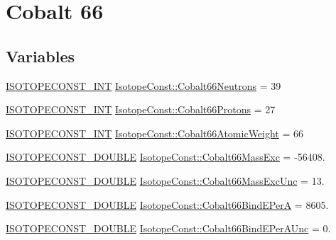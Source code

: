 \hypertarget{group___isotope_const-_cobalt-_co66}{}\section{Cobalt 66}
\label{group___isotope_const-_cobalt-_co66}
\subsection*{Variables}
\begin{DoxyCompactItemize}
\item 
\mbox{\hyperlink{group___isotope_const-_macros_ga5f18360b3e99483a35c32d789e62621c}{I\+S\+O\+T\+O\+P\+E\+C\+O\+N\+S\+T\+\_\+\+I\+NT}} \mbox{\hyperlink{group___isotope_const-_cobalt-_co66_ga19dc6760cf5fea107b61b0d1f699dc3a}{Isotope\+Const\+::\+Cobalt66\+Neutrons}} = 39
\item 
\mbox{\hyperlink{group___isotope_const-_macros_ga5f18360b3e99483a35c32d789e62621c}{I\+S\+O\+T\+O\+P\+E\+C\+O\+N\+S\+T\+\_\+\+I\+NT}} \mbox{\hyperlink{group___isotope_const-_cobalt-_co66_ga4cee81ba35179fd734057518c8e28585}{Isotope\+Const\+::\+Cobalt66\+Protons}} = 27
\item 
\mbox{\hyperlink{group___isotope_const-_macros_ga5f18360b3e99483a35c32d789e62621c}{I\+S\+O\+T\+O\+P\+E\+C\+O\+N\+S\+T\+\_\+\+I\+NT}} \mbox{\hyperlink{group___isotope_const-_cobalt-_co66_ga8c07a41896d436ac348195516a393fbb}{Isotope\+Const\+::\+Cobalt66\+Atomic\+Weight}} = 66
\item 
\mbox{\hyperlink{group___isotope_const-_macros_ga8f45a7272ce02c0b4c65c44636ed719a}{I\+S\+O\+T\+O\+P\+E\+C\+O\+N\+S\+T\+\_\+\+D\+O\+U\+B\+LE}} \mbox{\hyperlink{group___isotope_const-_cobalt-_co66_ga946fee28f61429e761521b1a4e7169a6}{Isotope\+Const\+::\+Cobalt66\+Mass\+Exc}} = -\/56408.
\item 
\mbox{\hyperlink{group___isotope_const-_macros_ga8f45a7272ce02c0b4c65c44636ed719a}{I\+S\+O\+T\+O\+P\+E\+C\+O\+N\+S\+T\+\_\+\+D\+O\+U\+B\+LE}} \mbox{\hyperlink{group___isotope_const-_cobalt-_co66_gac9fa8ef7a28b7d0e6df8f4ea871ded3d}{Isotope\+Const\+::\+Cobalt66\+Mass\+Exc\+Unc}} = 13.
\item 
\mbox{\hyperlink{group___isotope_const-_macros_ga8f45a7272ce02c0b4c65c44636ed719a}{I\+S\+O\+T\+O\+P\+E\+C\+O\+N\+S\+T\+\_\+\+D\+O\+U\+B\+LE}} \mbox{\hyperlink{group___isotope_const-_cobalt-_co66_ga42f553a4d27efc01f789ba5aaa490f1d}{Isotope\+Const\+::\+Cobalt66\+Bind\+E\+PerA}} = 8605.
\item 
\mbox{\hyperlink{group___isotope_const-_macros_ga8f45a7272ce02c0b4c65c44636ed719a}{I\+S\+O\+T\+O\+P\+E\+C\+O\+N\+S\+T\+\_\+\+D\+O\+U\+B\+LE}} \mbox{\hyperlink{group___isotope_const-_cobalt-_co66_gab5572f48324955ad1c8be15815c994ad}{Isotope\+Const\+::\+Cobalt66\+Bind\+E\+Per\+A\+Unc}} = 0.

\end{DoxyCompactItemize}
